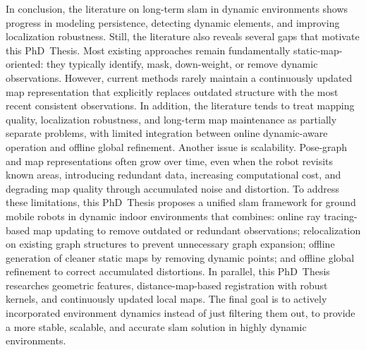 In conclusion, the literature on long-term \gls{slam} in dynamic environments
shows progress in modeling persistence, detecting dynamic elements, and
improving localization robustness. Still, the literature also reveals
several gaps that motivate this PhD~Thesis. Most existing approaches
remain fundamentally static-map-oriented: they typically identify, mask,
down-weight, or remove dynamic observations. However, current methods rarely
maintain a continuously updated map representation that explicitly
replaces outdated structure with the most recent consistent observations.
In addition, the literature tends to treat mapping quality,
localization robustness, and long-term map maintenance as partially
separate problems, with limited integration between
online dynamic-aware operation and offline global refinement.
Another issue is scalability. Pose-graph and map representations often grow
over time, even when the robot revisits known areas, introducing redundant data,
increasing computational cost, and degrading map quality through
accumulated noise and distortion. To address these limitations,
this PhD~Thesis proposes a unified \gls{slam} framework for ground mobile robots
in dynamic indoor environments that combines: online ray tracing-based
map updating to remove outdated or redundant observations;
relocalization on existing graph structures to prevent
unnecessary graph expansion; offline generation of cleaner static maps
by removing dynamic points; and offline global refinement
to correct accumulated distortions. In parallel,
this PhD~Thesis researches geometric features, distance-map-based registration
with robust kernels, and continuously updated local maps. The final goal is to
actively incorporated environment dynamics instead of just filtering them out,
to provide a more stable, scalable, and accurate \gls{slam} solution
in highly dynamic environments.
